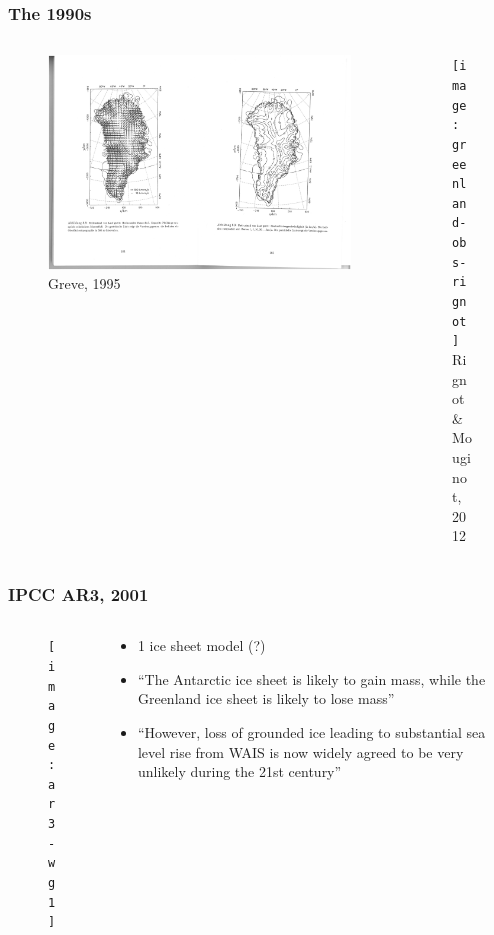 \documentclass[hide notes,intlimits]{beamer}
\begin{document}
\begin{frame}
  \frametitle{The 1990s}
      \vspace{-2em}
  \begin{columns}[c]
    \begin{column}{.5\linewidth}
    \begin{figure}
      \includegraphics[height=0.75\textheight]{greve_1995_flow}\\
      \tiny{Greve, 1995}
    \end{figure}
    \end{column}
    \begin{column}{.4\linewidth}
      \begin{figure}
      \texttt{[image: greenland-obs-rignot]}\\
      \tiny{Rignot \& Mouginot, 2012}
      \end{figure}
    \end{column}
  \end{columns}
\end{frame}


\begin{frame}
  \frametitle{IPCC AR3, 2001}
  \begin{columns}[c]
    \begin{column}{.4\linewidth}
      \begin{figure}
        \texttt{[image: ar3-wg1]}
      \end{figure}
    \end{column}
    \begin{column}{.5\linewidth}
      \begin{itemize}
        \item 1 ice sheet model (?)
        \item ``The Antarctic ice sheet is likely to gain mass, while the Greenland ice sheet is likely to lose mass''
        \item ``However, loss of grounded ice leading to substantial sea level rise from WAIS is now widely agreed to be very unlikely during the 21st century''
      \end{itemize}
    \end{column}
\end{columns}
\end{frame}
\end{document}
